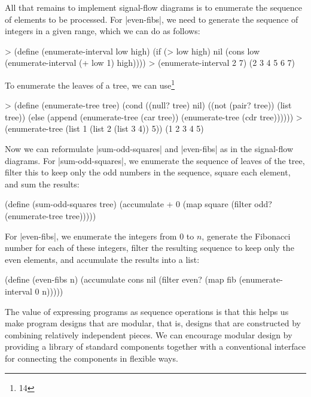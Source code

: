 All that remains to implement signal-flow diagrams is to enumerate the
sequence of elements to be processed.  For \scheme|even-fibs|, we need
to generate the sequence of integers in a given range, which we can do
as follows:
\begin{schemedisplay}
> (define (enumerate-interval low high)
    (if (> low high)
        nil
        (cons low (enumerate-interval (+ low 1) high))))
> (enumerate-interval 2 7)
(2 3 4 5 6 7)
\end{schemedisplay}

To enumerate the leaves of a tree, we can use\footnote{14}
\begin{schemedisplay}
> (define (enumerate-tree tree)
    (cond ((null? tree) nil)
          ((not (pair? tree)) (list tree))
          (else (append (enumerate-tree (car tree))
                        (enumerate-tree (cdr tree))))))
> (enumerate-tree (list 1 (list 2 (list 3 4)) 5))
(1 2 3 4 5)
\end{schemedisplay}

Now we can reformulate \scheme|sum-odd-squares| and \scheme|even-fibs|
as in the signal-flow diagrams.  For \scheme|sum-odd-squares|, we
enumerate the sequence of leaves of the tree, filter this to keep only
the odd numbers in the sequence, square each element, and sum the
results:

\begin{schemedisplay}
(define (sum-odd-squares tree)
  (accumulate +
              0
              (map square
                   (filter odd?
                           (enumerate-tree tree)))))
\end{schemedisplay}
For \scheme|even-fibs|, we enumerate the integers from 0 to $n$,
generate the Fibonacci number for each of these integers, filter the
resulting sequence to keep only the even elements, and accumulate the
results into a list:

\begin{schemedisplay}
(define (even-fibs n)
  (accumulate cons
              nil
              (filter even?
                      (map fib
                           (enumerate-interval 0 n)))))
\end{schemedisplay}


The value of expressing programs as sequence operations is that this
helps us make program designs that are modular, that is, designs that
are constructed by combining relatively independent pieces.  We can
encourage modular design by providing a library of standard components
together with a conventional interface for connecting the components
in flexible ways.

